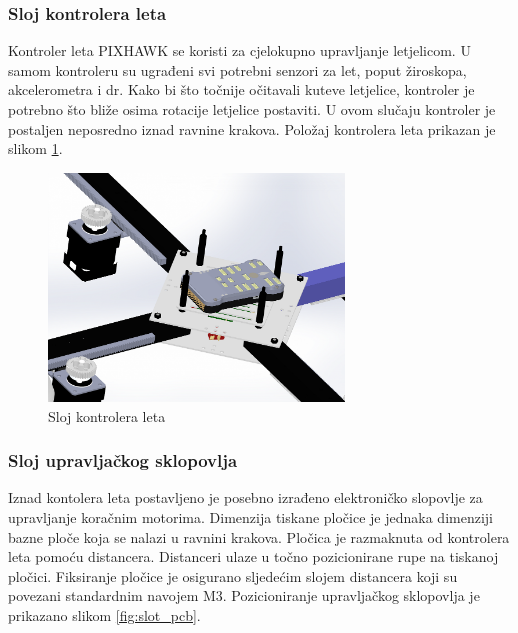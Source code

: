 \documentclass[11pt,a4paper]{article}
\begin{document}
\subsubsection{Sloj kontrolera leta}

Kontroler leta PIXHAWK se koristi za cjelokupno upravljanje letjelicom. U samom kontroleru su ugrađeni svi potrebni senzori za let, poput žiroskopa, akcelerometra i dr. Kako bi što točnije očitavali kuteve letjelice, kontroler je potrebno što bliže osima rotacije letjelice postaviti. U ovom slučaju kontroler je postaljen neposredno iznad ravnine krakova. Položaj kontrolera leta prikazan je slikom \ref{fig:slot_pixhawk}.

\begin{figure}[H]
	\centering
	\includegraphics[width=0.7\textwidth]{figures/arducopter_slot_pixhawk.png}
	\caption{Sloj kontrolera leta}
	\label{fig:slot_pixhawk}
\end{figure}


\subsubsection{Sloj upravljačkog sklopovlja}

Iznad kontolera leta postavljeno je posebno izrađeno elektroničko slopovlje za upravljanje koračnim motorima. Dimenzija tiskane pločice je jednaka dimenziji bazne ploče koja se nalazi u ravnini krakova. Pločica je 
razmaknuta od kontrolera leta pomoću distancera. Distanceri ulaze u točno pozicionirane rupe na tiskanoj pločici. Fiksiranje pločice je osigurano sljedećim slojem distancera koji su povezani standardnim navojem M3. Pozicioniranje upravljačkog sklopovlja je prikazano slikom \ref{fig:slot_pcb}.
\end{document}
